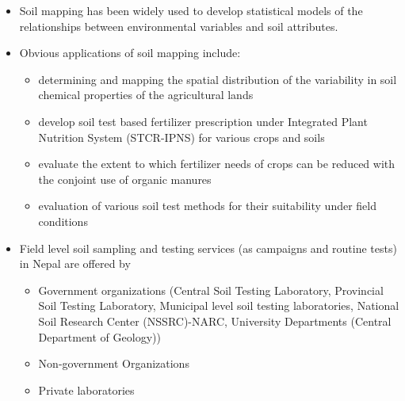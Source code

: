 \documentclass[11pt,dvipsnames,ignorenonframetext,aspectratio=169]{beamer}
\providecommand{\tightlist}{%
  \setlength{\itemsep}{0pt}\setlength{\parskip}{0pt}}
\begin{document}
\begin{frame}{}
\protect\hypertarget{section-7}{}
\small

\begin{itemize}
\tightlist
\item
  Soil mapping has been widely used to develop statistical models of the
  relationships between environmental variables and soil attributes.
\item
  Obvious applications of soil mapping include:

  \begin{itemize}
  \footnotesize
  \item determining and mapping the spatial distribution of the variability in soil chemical properties of the agricultural lands
  \item develop soil test based fertilizer prescription under Integrated Plant Nutrition System (STCR-IPNS) for various crops and soils
  \item evaluate the extent to which fertilizer needs of crops can be reduced with the conjoint use of organic manures
  \item evaluation of various soil test methods for their suitability under field conditions
  \end{itemize}
\item
  Field level soil sampling and testing services (as campaigns and
  routine tests) in Nepal are offered by

  \begin{itemize}
  \footnotesize
  \item Government organizations (Central Soil Testing Laboratory, Provincial Soil Testing Laboratory, Municipal level soil testing laboratories, National Soil Research Center (NSSRC)-NARC, University Departments (Central Department of Geology))
  \item Non-government Organizations
  \item Private laboratories
  \end{itemize}
\end{itemize}
\end{frame}
\end{document}
